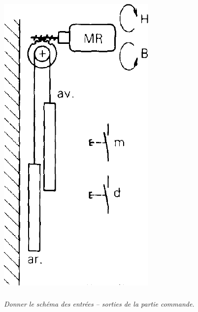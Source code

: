 \documentclass[10pt]{article}
\begin{document}
\begin{minipage}[c]{.25\linewidth}
\begin{center}
\includegraphics[width=.95\textwidth]{images/fig_01}
\end{center}
\end{minipage}
\subparagraph{}
\textit{Donner le schéma des entrées -- sorties de la partie commande.}
\end{document}
